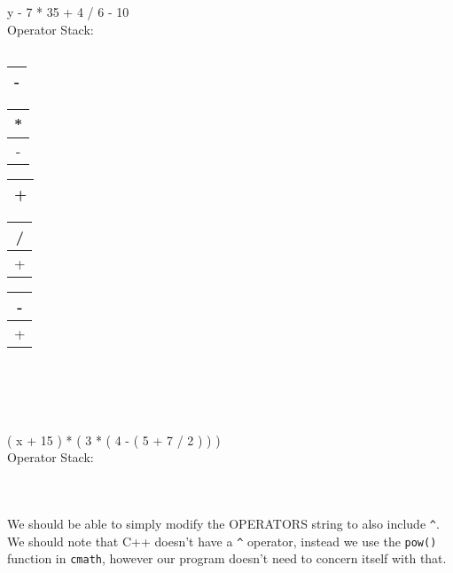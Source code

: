 \documentclass[12pt]{article}
\begin{document}
\section{}
y - 7 * 35 + 4 / 6 - 10\\
Operator Stack:\\
\begin{tabular}{|c|}
  \hline
  \\ \hline
\end{tabular}
\begin{tabular}{|c|}
  \hline
  -\\ \hline
\end{tabular}
\begin{tabular}{|c|}
  \hline
  *\\ \hline
  -\\ \hline
\end{tabular}
\begin{tabular}{|c|}
  \hline
  +\\ \hline
\end{tabular}
\begin{tabular}{|c|}
  \hline
  /\\ \hline
  +\\ \hline
\end{tabular}
\begin{tabular}{|c|}
  \hline
  -\\ \hline
  +\\ \hline
\end{tabular}\\
\\
\\
\\
( x + 15 ) * ( 3 * ( 4 - ( 5 + 7 / 2 ) ) )\\
Operator Stack:\\
\begin{tabular}{|c|}
  \hline
  \\ \hline
\end{tabular}
\section{}
  We should be able to simply modify the OPERATORS string to also include \texttt{\^}. We should note that C++ doesn't have a \texttt{\^} operator, instead we use the \texttt{pow()} function in \texttt{cmath}, however our program doesn't need to concern itself with that.
\end{document}

